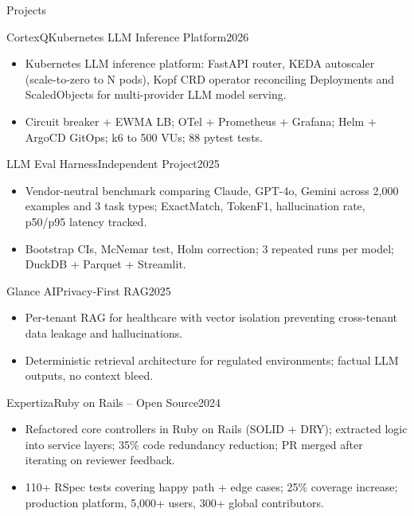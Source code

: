 \documentclass[]{mcdowellcv}
\begin{document}
\begin{cvsection}{Projects}
  \begin{cvsubsection}{CortexQ}{Kubernetes LLM Inference Platform}{2026}
    \begin{itemize}
      \item Kubernetes LLM inference platform: FastAPI router, KEDA autoscaler (scale-to-zero to N pods), Kopf CRD operator reconciling Deployments and ScaledObjects for multi-provider LLM model serving.
      \item Circuit breaker + EWMA LB; OTel + Prometheus + Grafana; Helm + ArgoCD GitOps; k6 to 500 VUs; 88 pytest tests.
    \end{itemize}
    \vspace{-1.5pt}
  \end{cvsubsection}

  \begin{cvsubsection}{LLM Eval Harness}{Independent Project}{2025}
    \begin{itemize}
      \item Vendor-neutral benchmark comparing Claude, GPT-4o, Gemini across 2,000 examples and 3 task types; ExactMatch, TokenF1, hallucination rate, p50/p95 latency tracked.
      \item Bootstrap CIs, McNemar test, Holm correction; 3 repeated runs per model; DuckDB + Parquet + Streamlit.
    \end{itemize}
    \vspace{-1.5pt}
  \end{cvsubsection}

  \begin{cvsubsection}{Glance AI}{Privacy-First RAG}{2025}
    \begin{itemize}
      \item Per-tenant RAG for healthcare with vector isolation preventing cross-tenant data leakage and hallucinations.
      \item Deterministic retrieval architecture for regulated environments; factual LLM outputs, no context bleed.
    \end{itemize}
    \vspace{-1.5pt}
  \end{cvsubsection}

  \begin{cvsubsection}{Expertiza}{Ruby on Rails -- Open Source}{2024}
    \begin{itemize}
      \item Refactored core controllers in Ruby on Rails (SOLID + DRY); extracted logic into service layers; 35\% code redundancy reduction; PR merged after iterating on reviewer feedback.
      \item 110+ RSpec tests covering happy path + edge cases; 25\% coverage increase; production platform, 5,000+ users, 300+ global contributors.
    \end{itemize}
  \end{cvsubsection}
\end{cvsection}
\end{document}
